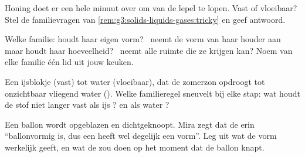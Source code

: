 \begin{exercise}[$\star$]\label{exo:g3:solids-liquids-gases:8}
Honing doet er een hele minuut over om van de lepel te lopen.
Vast of vloeibaar? Stel de familievragen van
\cref{rem:g3:solids-liquids-gases:tricky} en geef antwoord.
\end{exercise}

\begin{exercise}[$\star$]\label{exo:g3:solids-liquids-gases:9}
Welke familie: houdt haar eigen vorm? \ neemt de vorm van haar houder
aan maar houdt haar hoeveelheid? \ neemt alle ruimte die ze krijgen
kan? Noem van elke familie één lid uit jouw keuken.
\end{exercise}

\begin{exercise}[$\star\star$]\label{exo:g3:solids-liquids-gases:10}
Een ijsblokje (vast)  tot water (vloeibaar), dat de zomerzon
opdroogt tot onzichtbaar vliegend water (). Welke familieregel
sneuvelt bij elke stap: wat houdt de stof niet langer vast als ijs
? en als water ?
\end{exercise}

\begin{exercise}[$\star\star$]\label{exo:g3:solids-liquids-gases:11}
Een ballon wordt opgeblazen en dichtgeknoopt. Mira zegt dat de
 erin ``ballonvormig is, dus een  heeft wel degelijk een
vorm''. Leg uit wat de vorm werkelijk geeft, en wat de  zou doen
op het moment dat de ballon knapt.
\end{exercise}

